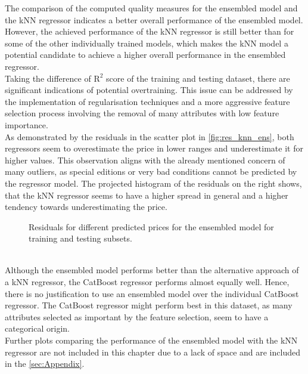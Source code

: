 The comparison of the computed quality measures for the ensembled model and the kNN regressor indicates a better
overall performance of the ensembled model. However, the achieved performance of the 
kNN regressor is still better than for some of the other individually trained models, which makes the kNN
model a potential candidate to achieve a higher overall performance in the ensembled regressor.\\
Taking the difference of $ \mathrm{R}^2 $ score of the training and testing dataset, there
are significant indications of potential overtraining. This issue can 
be addressed by the implementation of regularisation techniques and a more aggressive feature selection process involving the removal of many 
attributes with low feature importance.\\
As demonstrated by the residuals in the scatter plot in \autoref{fig:res_knn_ens}, both regressors seem to 
overestimate the price in lower ranges and underestimate it for higher values. This observation aligns with the already mentioned concern
of many outliers, as special editions or very bad conditions cannot be predicted
by the regressor model. The projected histogram of the residuals on the right shows, that the kNN regressor seems
to have a higher spread in general and a higher tendency towards underestimating the price. 
\begin{figure}
\centering
    \caption{Residuals for different predicted prices for the ensembled model for training and testing subsets.}
    \label{fig:res_knn_ens}
\end{figure}
\\ Although the ensembled model performs better than the alternative approach of a kNN regressor, the CatBoost regressor performs
almost equally well. Hence, there is no justification to use an ensembled model over the individual CatBoost regressor. The CatBoost
regressor might perform best in this dataset, as many attributes selected as important by the feature selection, seem to have a categorical
origin.\\
Further plots comparing the performance of the ensembled model with the kNN regressor are not included in this chapter due to a lack of space and 
are included in the \autoref{sec:Appendix}.
    
\newpage